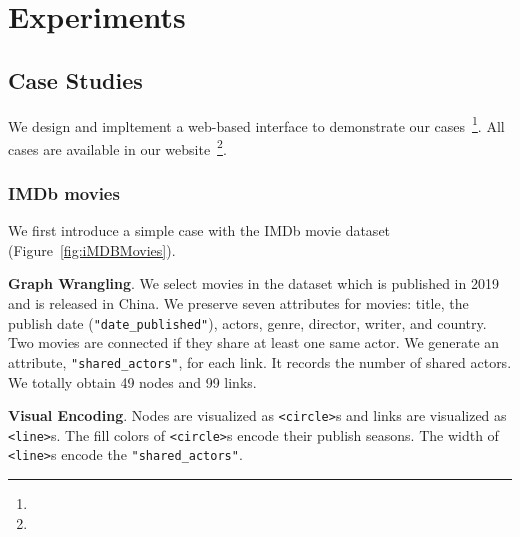 \section{Experiments}
\subsection{Case Studies}
We design and impltement a web-based interface to demonstrate our cases~\footnote{}.
All cases are available in our website~\footnote{}.

\subsubsection{IMDb movies}\label{sec:imdb_movies}
We first introduce a simple case with the IMDb movie dataset~\cite{} (Figure~\ref{fig:iMDBMovies}).

\textbf{Graph Wrangling}. We select movies in the dataset which is published in 2019 and is released in China.
We preserve seven attributes for movies: title, the publish date (\texttt{"date\_published"}), actors, genre, director, writer, and country.
Two movies are connected if they share at least one same actor.
We generate an attribute, \texttt{"shared\_actors"}, for each link. 
It records the number of shared actors.
We totally obtain 49 nodes and 99 links.

\textbf{Visual Encoding}. Nodes are visualized as \texttt{<circle>}s and links are visualized as \texttt{<line>}s.
The fill colors of \texttt{<circle>}s encode their publish seasons.
The width of \texttt{<line>}s encode the \texttt{"shared\_actors"}.

